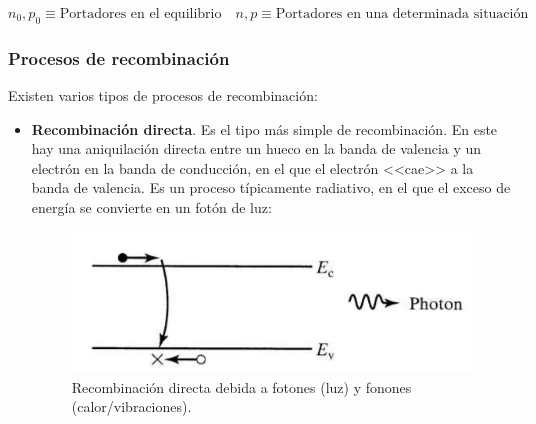 \begin{equation*}
	n_{0},p_{0} \equiv \text{Portadores en el equilibrio} \quad n,p \equiv \text{Portadores en una determinada situación}
\end{equation*}


\subsubsection{Procesos de recombinación}

Existen varios tipos de procesos de recombinación:

\begin{itemize}
	\item \textbf{Recombinación directa}. Es el tipo más simple de recombinación. En este hay una aniquilación directa entre un hueco en la banda de valencia y un electrón en la banda de conducción, en el que el electrón <<cae>> a la banda de valencia. Es un proceso típicamente radiativo, en el que el exceso de energía se convierte en un fotón de luz:

	\begin{figure}[h!] \centering
		\includegraphics[width=0.5\linewidth]{Cuerpo/Ch_02/02_R_Directa.png}
		\caption{Recombinación directa debida a fotones (luz) y fonones (calor/vibraciones).}
	\end{figure}
	

\end{itemize}
